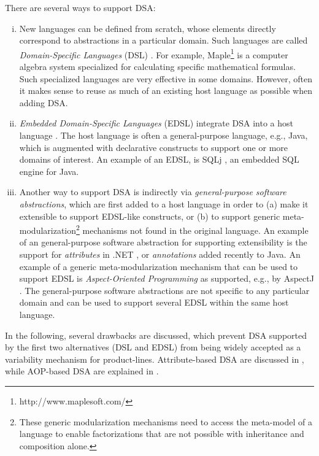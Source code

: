 \noindent There are several ways to support DSA:

\begin{enumerate}[i.]
\item New languages can be defined from scratch, whose elements directly correspond to abstractions in a particular domain. Such languages are called \textit{Domain-Specific Languages} (DSL) \cite{deursenetal.00}. For example, Maple\footnote{http://www.maplesoft.com/} is a computer algebra system specialized for calculating specific mathematical formulas. Such specialized languages are very effective in some domains. However, often it makes sense to reuse as much of an existing host language as possible when adding DSA.

\item \textit{Embedded Domain-Specific Languages} (EDSL) integrate DSA into a host language \cite{leijen.99,kamin.98}. The host language is often a general-purpose language, e.g., Java, which is augmented with declarative constructs to support one or more domains of interest. An example of an EDSL, is SQLj \cite{www.sqlj}, an embedded SQL engine for Java.

\item Another way to support DSA is indirectly via \textit{general-purpose software abstractions}, which are first added to a host language in order to (a) make it  extensible to support EDSL-like constructs, or (b) to support generic meta-modularization\footnote{These generic modularization mechanisms need to access the meta-model of a language to enable factorizations that are not possible with inheritance and composition alone.} mechanisms not found in the original language. An example of an general-purpose software abstraction for supporting extensibility is the support for \textit{attributes} in .NET \cite{www.dotnet}, or \textit{annotations} added recently to Java. An example of a generic meta-modularization mechanism that can be used to support EDSL is \textit{Aspect-Oriented Programming} \cite{kiczalesetal.97} as supported, e.g., by AspectJ \cite{www.aspectjt,Laddad.aop} . The general-purpose software abstractions are not specific to any particular domain and can be used to support several EDSL within the same host language.
\end{enumerate}

\noindent In the following, several drawbacks are discussed, which prevent DSA supported by the first two alternatives (DSL and EDSL) from being widely accepted as a variability mechanism for product-lines. Attribute-based DSA are discussed in , while AOP-based DSA are explained in .

